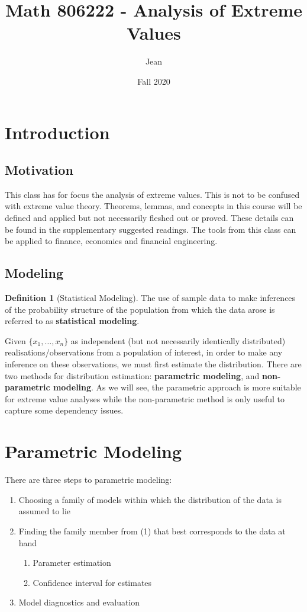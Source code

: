 \documentclass{article}
\title{Math 806222 - Analysis of Extreme Values}
\author{Jean }
\date{Fall 2020}
\theoremstyle{definition}
\theoremstyle{definition}
\newtheorem{definition}{Definition}
\def\xs{\{x_1, \hdots, x_n\}}
\begin{document}
\maketitle
\tableofcontents{}
\pagebreak

\section{Introduction}
\subsection{Motivation}
This class has for focus the analysis of extreme values. This is not to be confused with extreme value theory. Theorems, lemmas, and concepts in this course will be defined and applied but not necessarily fleshed out or proved. These details can be found in the supplementary suggested readings. The tools from this class can be applied to finance, economics and financial engineering.
\subsection{Modeling}
\begin{definition}[Statistical Modeling] The use of sample data to make inferences of the probability structure of the population from which the data arose is referred to as \textbf{statistical modeling}.
\end{definition}
Given $\xs$ as independent (but not necessarily identically distributed) realisations/observations from a population of interest, in order to make any inference on these observations, we must first estimate the distribution. There are two methods for distribution estimation: \textbf{parametric modeling}, and \textbf{non-parametric modeling}. As we will see, the parametric approach is more suitable for extreme value analyses while the non-parametric method is only useful to capture some dependency issues.

\section{Parametric Modeling}
There are three steps to parametric modeling:
\begin{enumerate}
    \item Choosing a family of models within which the distribution of the data is assumed to lie
    \item Finding the family member from (1) that best corresponds to the data at hand
    \begin{enumerate}
        \item Parameter estimation
        \item Confidence interval for estimates
    \end{enumerate}
    \item Model diagnostics and evaluation
\end{enumerate}
\end{document}
